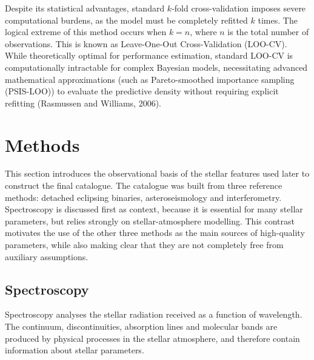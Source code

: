Despite its statistical advantages, standard $k$-fold cross-validation imposes severe computational burdens, as the model must be completely refitted $k$ times. The logical extreme of this method occurs when $k = n$, where $n$ is the total number of observations. This is known as Leave-One-Out Cross-Validation (LOO-CV). While theoretically optimal for performance estimation, standard LOO-CV is computationally intractable for complex Bayesian models, necessitating advanced mathematical approximations (such as Pareto-smoothed importance sampling (PSIS-LOO)) to evaluate the predictive density without requiring explicit refitting (Rasmussen and Williams, 2006).

\fi

\section{Methods} \label{methods}

This section introduces the observational basis of the stellar features used later to construct the final catalogue. The catalogue was built from three reference methods: detached eclipsing binaries, asteroseismology and interferometry. Spectroscopy is discussed first as context, because it is essential for many stellar parameters, but relies strongly on stellar-atmosphere modelling. This contrast motivates the use of the other three methods as the main sources of high-quality parameters, while also making clear that they are not completely free from auxiliary assumptions.

\subsection{Spectroscopy}

Spectroscopy analyses the stellar radiation received as a function of wavelength. The continuum, discontinuities, absorption lines and molecular bands are produced by physical processes in the stellar atmosphere, and therefore contain information about stellar parameters.

